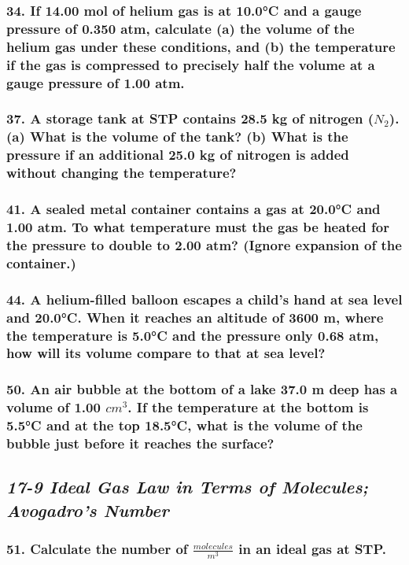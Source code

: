 \documentclass{article}
\begin{document}
\subsubsection*{
    34. If 14.00 mol of helium gas is at 10.0°C and a gauge pressure of 0.350 atm,
    calculate (a) the volume of the helium gas under these conditions, and (b) the
    temperature if the gas is compressed to precisely half the volume at a gauge
    pressure of 1.00 atm.
}
\subsubsection*{
    37. A storage tank at STP contains 28.5 kg of nitrogen ($N_2$). (a) What is
    the volume of the tank? (b) What is the pressure if an additional 25.0 kg
    of nitrogen is added without changing the temperature?
}
\subsubsection*{
    41. A sealed metal container contains a gas at 20.0°C and 1.00 atm. To what
    temperature must the gas be heated for the pressure to double to 2.00 atm? 
    (Ignore expansion of the container.)
}
\subsubsection*{
    44. A helium-filled balloon escapes a child’s hand at sea level and 20.0°C.
    When it reaches an altitude of 3600 m, where the temperature is 5.0°C and
    the pressure only 0.68 atm, how will its volume compare to that at sea level?
}
\subsubsection*{
    50. An air bubble at the bottom of a lake 37.0 m deep has a volume of
    1.00 $cm^3$. If the temperature at the bottom is 5.5°C and at the top
    18.5°C, what is the volume of the bubble just before it reaches the surface?
}
\begin{center}
    \subsection*{\textbf{\textit{17-9 Ideal Gas Law in Terms of Molecules;
    Avogadro's Number}}}
\end{center}
\subsubsection*{
    51. Calculate the number of $\frac{molecules}{m^3}$ in an ideal gas at STP.
}
\end{document}
